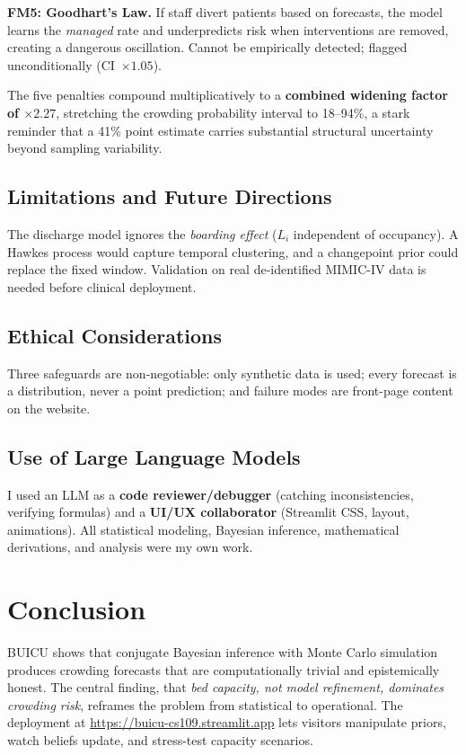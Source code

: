 \documentclass[10pt, twocolumn]{article}
\begin{document}
\smallskip\noindent\textbf{FM5: Goodhart's Law.} If staff divert
patients based on forecasts, the model learns the \emph{managed}
rate and underpredicts risk when interventions are removed, creating a
dangerous oscillation. Cannot be empirically detected; flagged
unconditionally (CI~$\times 1.05$).

\smallskip\noindent The five penalties compound multiplicatively to a
\textbf{combined widening factor of $\times 2.27$}, stretching the
crowding probability interval to 18--94\%, a stark reminder that a
41\% point estimate carries substantial structural uncertainty beyond
sampling variability.

\subsection{Limitations and Future Directions}

The discharge model ignores the \emph{boarding effect}
($L_i$ independent of occupancy). A Hawkes process would capture
temporal clustering, and a changepoint prior could replace the fixed
window. Validation on real de-identified MIMIC-IV data is needed
before clinical deployment.

\subsection{Ethical Considerations}

Three safeguards are non-negotiable: only synthetic data is used;
every forecast is a distribution, never a point prediction; and failure
modes are front-page content on the website.

\subsection{Use of Large Language Models}

I used an LLM as a \textbf{code reviewer/debugger} (catching
inconsistencies, verifying formulas) and a \textbf{UI/UX collaborator}
(Streamlit CSS, layout, animations). All statistical modeling, Bayesian
inference, mathematical derivations, and analysis were my own work.

\section{Conclusion}

BUICU shows that conjugate Bayesian inference with Monte Carlo
simulation produces crowding forecasts that are computationally trivial
and epistemically honest. The central finding, that \emph{bed capacity,
not model refinement, dominates crowding risk}, reframes the problem
from statistical to operational. The deployment at
\url{https://buicu-cs109.streamlit.app} lets visitors manipulate
priors, watch beliefs update, and stress-test capacity scenarios.
\end{document}
